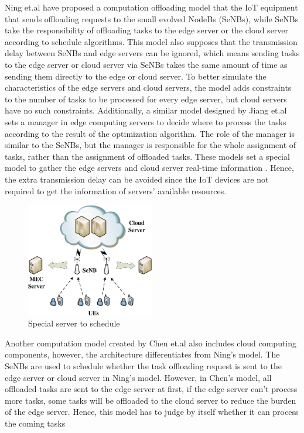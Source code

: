 \documentclass[a4paper,11pt]{article}
\begin{document}
Ning et.al \cite{A_Cooperative_Partial_Computation_Offloading_Scheme_for_Mobile_Edge} have proposed a computation offloading model that the IoT equipment that sends offloading requests to the small evolved NodeBs (SeNBs), while SeNBs take the responsibility of offloading tasks to the edge server or the cloud server according to schedule algorithms. This model also supposes that the transmission delay between SeNBs and edge servers can be ignored, which means sending tasks to the edge server or cloud server via SeNBs takes the same amount of time as sending them directly to the edge or cloud server. To better simulate the characteristics of the edge servers and cloud servers, the model adds constraints to the number of tasks to be processed for every edge server, but cloud servers have no such constraints. Additionally, a similar model designed by Jiang et.al \cite{cloud_3_edgemanager} sets a manager in edge computing servers to decide where to process the tasks according to the result of the optimization algorithm. The role of the manager is similar to the SeNBs, but the manager is responsible for the whole assignment of tasks, rather than the assignment of offloaded tasks. These models set a special model to gather the edge servers and cloud server real-time information \cite{A_Cooperative_Partial_Computation_Offloading_Scheme_for_Mobile_Edge}. Hence, the extra transmission delay can be avoided since the IoT devices are not required to get the information of servers' available resources. \newline

\begin{figure}[h]
        \centering
        \includegraphics[width=0.5\textwidth]{SeNBs.png}
        \caption{Special server to schedule \cite{A_Cooperative_Partial_Computation_Offloading_Scheme_for_Mobile_Edge}}
\end{figure}

Another computation model created by Chen et.al \cite{cloud_2_edgeconnectedtocloud} also includes cloud computing components, however, the architecture differentiates from Ning's model. The SeNBs are used to schedule whether the task offloading request is sent to the edge server or cloud server in Ning's model. However, in Chen's model, all offloaded tasks are sent to the edge server at first, if the edge server can't process more tasks, some tasks will be offloaded to the cloud server to reduce the burden of the edge server. Hence, this model has to judge by itself whether it can process the coming tasks 
\end{document}

